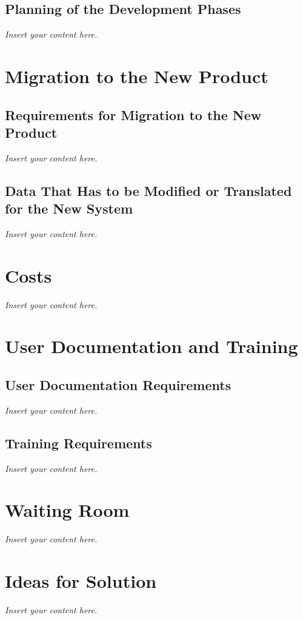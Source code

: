 \documentclass[12pt]{article}
\newcommand{\lips}{\textit{Insert your content here.}}
\begin{document}
\subsection{Planning of the Development Phases}
\lips

\section{Migration to the New Product}
\subsection{Requirements for Migration to the New Product}
\lips
\subsection{Data That Has to be Modified or Translated for the New System}
\lips

\section{Costs}
\lips
\section{User Documentation and Training}
\subsection{User Documentation Requirements}
\lips
\subsection{Training Requirements}
\lips

\section{Waiting Room}
\lips

\section{Ideas for Solution}
\lips
\end{document}
